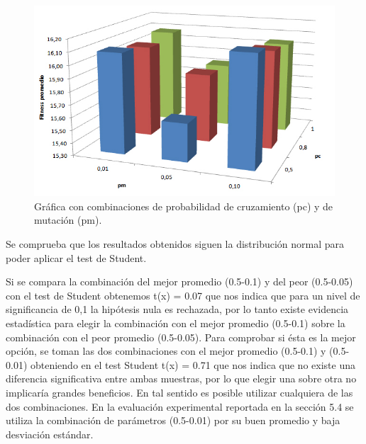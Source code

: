\begin{figure}[H]
	\centering
	\includegraphics[width=0.8\linewidth]{Figures/grafica_mutacion_cruzamiento}
	\caption[Gráfica con combinaciones de probabilidad de cruzamiento y de mutación.]{Gráfica con combinaciones de probabilidad de cruzamiento (pc) y de mutación (pm).}
	\label{fig:grafica_mutacion_cruzamiento}
\end{figure}


Se comprueba que los resultados obtenidos siguen la distribución normal para poder aplicar el test de Student. 

%
%

Si se compara la combinación del mejor promedio (0.5-0.1) y del peor (0.5-0.05) con el test de Student obtenemos t(x) = 0.07 que nos indica que para un nivel de significancia de  0,1 la hipótesis nula es rechazada, por lo tanto existe evidencia estadística para elegir la combinación con el mejor promedio (0.5-0.1) sobre la combinación con el peor promedio (0.5-0.05). Para comprobar si ésta es la mejor opción, se toman las dos combinaciones con el mejor promedio (0.5-0.1) y (0.5-0.01) obteniendo en el test Student t(x) = 0.71 que nos indica que no existe una diferencia significativa entre ambas muestras, por lo que elegir una sobre otra no implicaría grandes beneficios. En tal sentido es posible utilizar cualquiera de las dos combinaciones. En la evaluación experimental reportada en la sección 5.4 se utiliza la combinación de parámetros (0.5-0.01) por su buen promedio y baja desviación estándar.



